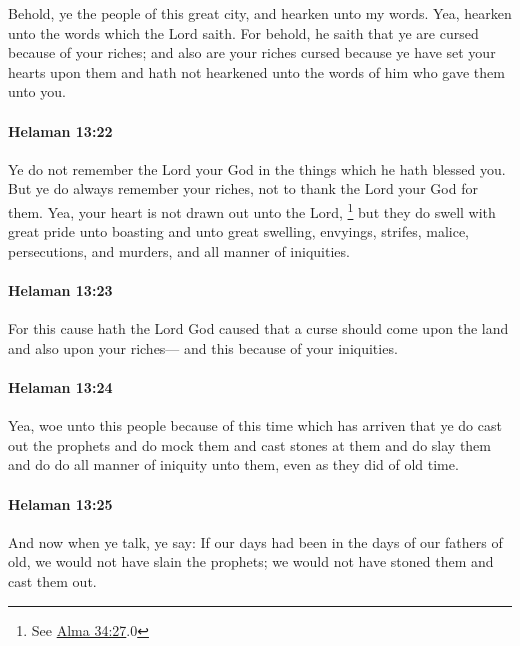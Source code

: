 			Behold, ye the people of this great city,
			and hearken unto my words.
			Yea, hearken unto the words which the Lord saith.
			For behold, he saith that ye are cursed because of your riches;
			and also are your riches cursed
			because ye have set your hearts upon them
			and hath not hearkened unto the words of him who gave them unto you.

		\paragraph{Helaman 13:22} %
			\label{HELAMAN-13-22}

			Ye do not remember the Lord your God
			in the things which he hath blessed you.
			But ye do always remember your riches,
			not to thank the Lord your God for them.
			Yea, your heart is not drawn out unto the Lord,%
				\footnote{%
					See \hyperref[ALMA-34-27]{Alma 34:27}.0
					}
			but they do swell with great pride unto boasting
			and unto great swelling, envyings, strifes, malice, persecutions, and murders,
			and all manner of iniquities.

		\paragraph{Helaman 13:23} %
			\label{HELAMAN-13-23}

			For this cause hath the Lord God caused
			that a curse should come upon the land and also upon your riches---
			and this because of your iniquities.

		\paragraph{Helaman 13:24} %
			\label{HELAMAN-13-24}

			Yea, woe unto this people because of this time which has arriven
			that ye do cast out the prophets and do mock them
			and cast stones at them and do slay them
			and do do all manner of iniquity unto them,
			even as they did of old time.

		\paragraph{Helaman 13:25} %
			\label{HELAMAN-13-25}

			And now when ye talk, ye say:
			If our days had been in the days of our fathers of old,
			we would not have slain the prophets;
			we would not have stoned them and cast them out.

